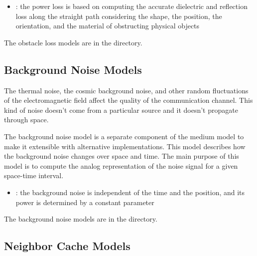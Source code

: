 \begin{itemize}
  \item {}: the power loss is based on computing the
accurate dielectric and reflection loss along the straight path considering the
shape, the position, the orientation, and the material of obstructing physical
objects
\end{itemize}

The obstacle loss models are in the 
directory.

\subsection{Background Noise Models}

The thermal noise, the cosmic background noise, and other random fluctuations of
the electromagnetic field affect the quality of the communication channel. This
kind of noise doesn't come from a particular source and it doesn't propagate
through space.

The background noise model is a separate component of the medium model to make
it extensible with alternative implementations. This model describes how the
background noise changes over space and time. The main purpose of this model is
to compute the analog representation of the noise signal for a given space-time
interval.

\begin{itemize}
  \item {}: the background noise is independent
of the time and the position, and its power is determined by a constant parameter 
\end{itemize}

The background noise models are in the 
directory.

\subsection{Neighbor Cache Models}


